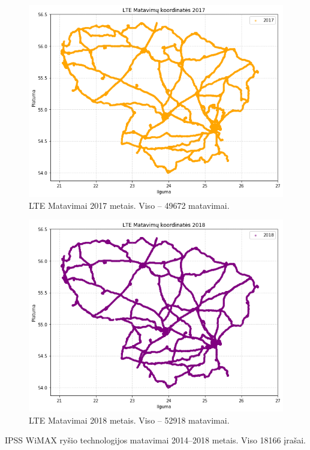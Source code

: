 \documentclass{VUMIFPSbakalaurinis}
\begin{document}
\begin{figure}[H]
	\centering
	\includegraphics[scale=0.33]{img/LTE-4}
	\caption{LTE Matavimai 2017 metais. Viso – 49672 matavimai.}
	\label{img:LTE-4}
\end{figure}
\begin{figure}[H]
	\centering
	\includegraphics[scale=0.33]{img/LTE-5}
	\caption{LTE Matavimai 2018 metais. Viso – 52918 matavimai.}
	\label{img:LTE-5}
\end{figure}
IPSS WiMAX ryšio technologijos matavimai 2014–2018 metais. Viso 18166 įrašai.
\end{document}
